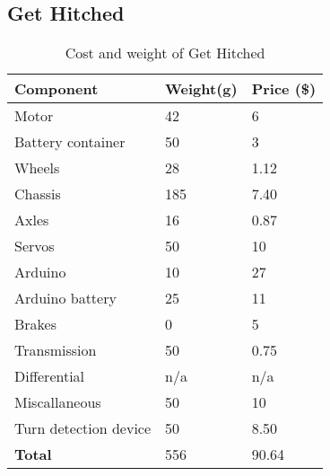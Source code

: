 \documentclass[class=../../report, crop=false]{standalone}
\newcommand{\weight}[1]{
	\cellcolor{blue!10}#1
}
\newcommand{\cost}[1]{
	\cellcolor{green!10}#1
}
\newcommand{\total}[1]{
	\cellcolor{green!25}#1
}
\begin{document}
\subsection{Get Hitched}
\begin{table}[H]
	\centering
	\begin{tabular}{| l | l | l|}
		\hline
		\textbf{Component} & \textbf{Weight(g)} & \textbf{Price (\$)}\\ \hline
		Motor					& \weight{42}	& \cost{6}		\\ \hline
		Battery container		& \weight{50}	& \cost{3}		\\ \hline
		Wheels					& \weight{28}	& \cost{1.12}	\\ \hline
		Chassis					& \weight{185}	& \cost{7.40}	\\ \hline
		Axles					& \weight{16}	& \cost{0.87}	\\ \hline
		Servos					& \weight{50}	& \cost{10}		\\ \hline
		Arduino					& \weight{10}	& \cost{27}		\\ \hline
		Arduino battery			& \weight{25}	& \cost{11}		\\ \hline
		Brakes					& \weight{0}	& \cost{5}		\\ \hline
		Transmission			& \weight{50}	& \cost{0.75}	\\ \hline
		Differential			& \weight{n/a}	& \cost{n/a}	\\ \hline
		Miscallaneous			& \weight{50}	& \cost{10}		\\ \hline
		Turn detection device	& \weight{50}	& \cost{8.50}		\\ \hline
		\total{\textbf{Total}} 	& \total{556}	& \total{90.64}	\\ \hline
	\end{tabular}
	\caption{Cost and weight of Get Hitched}
\end{table}
\end{document}
